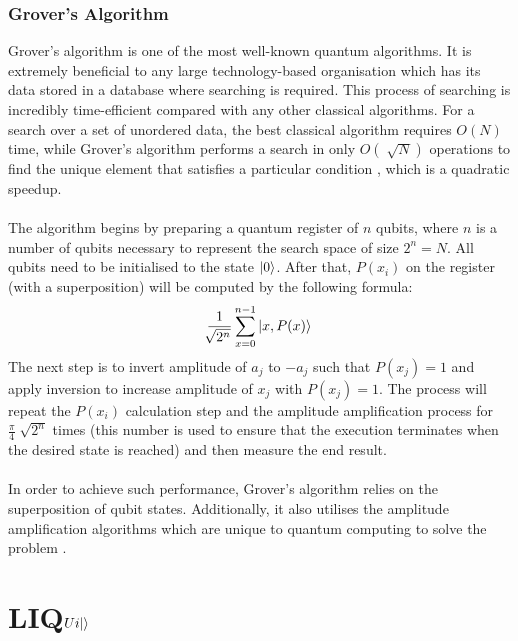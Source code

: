 \documentclass[12pt]{third-rep}
\begin{document}
\subsection{Grover's Algorithm}
Grover's algorithm is one of the most well-known quantum algorithms. It is extremely beneficial to any large technology-based organisation which has its data stored in a database where searching is required. This process of searching is incredibly time-efficient compared with any other classical algorithms. For a search over a set of unordered data, the best classical algorithm requires $O(N)$ time, while Grover's algorithm performs a search in only $O(\sqrt[]{N})$ operations to find the unique element that satisfies a particular condition \cite{umass}, which is a quadratic speedup. \\\\
The algorithm begins by preparing a quantum register of $n$ qubits, where $n$ is a number of qubits necessary to represent the search space of size $2^n=N$. All qubits need to be initialised to the state ${\left\vert{0}\right\rangle}$. After that, $P(x_i)$ on the register (with a superposition) will be computed by the following formula:
$$\frac{1}{\sqrt[]{2^n}}\sum_{x=0}^{n-1}{\left\vert{x,P(x)}\right\rangle}$$
The next step is to invert amplitude of $a_j$ to $-a_j$ such that $P(x_j)=1$ and apply inversion to increase amplitude of $x_j$ with $P(x_j)=1$. The process will repeat the $P(x_i)$ calculation step and the amplitude amplification process for $\frac{\pi}{4}\sqrt[]{2^n}$ times (this number is used to ensure that the execution terminates when the desired state is reached) and then measure the end result. \\\\
In order to achieve such performance, Grover's algorithm relies on the superposition of qubit states. Additionally, it also utilises the amplitude amplification algorithms which are unique to quantum computing to solve the problem \cite{umass}.

\begingroup
\renewcommand{\cleardoublepage}{}
\renewcommand{\clearpage}{}
\chapter{LIQ$Ui{\left\vert{}\right\rangle}$}
\endgroup

\end{document}
